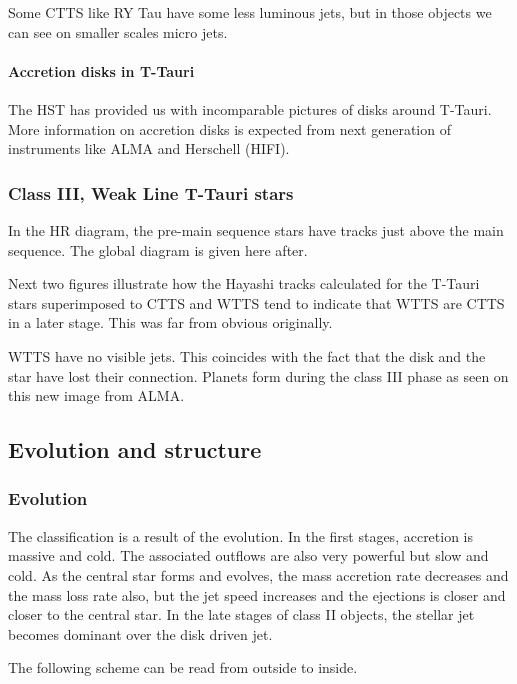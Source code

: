 \documentclass[10pt,a4paper,english,draft]{article}
\begin{document}
Some CTTS like RY Tau have some less luminous jets, but in those objects we can see on smaller scales micro jets.

\paragraph{Accretion disks in T-Tauri}
The HST has provided us with incomparable pictures of disks around T-Tauri. More information on accretion disks is expected from next generation of instruments like ALMA and Herschell (HIFI).

\subsubsection{Class III, Weak Line T-Tauri stars}
In the HR diagram, the pre-main sequence stars have tracks just above the main sequence. The global diagram is given here after.


Next two figures illustrate how the Hayashi tracks calculated for the T-Tauri stars superimposed to CTTS and WTTS tend to indicate that WTTS are CTTS in a later stage. This was far from obvious originally.

WTTS have no visible jets. This coincides with the fact that the disk and the star have lost their connection. Planets form during the class III phase as seen on this new image from ALMA.

\subsection{Evolution and structure}

\subsubsection{Evolution}
The classification is a result of the evolution. In the first stages, accretion is massive and cold. The associated outflows are also very powerful but slow and cold. As the central star forms and evolves, the mass accretion rate decreases and the mass loss rate also, but the jet speed increases and the ejections is closer and closer to the central star. In the late stages of class II objects, the stellar jet becomes dominant over the disk driven jet.

The following scheme can be read from outside to inside.
\end{document}
